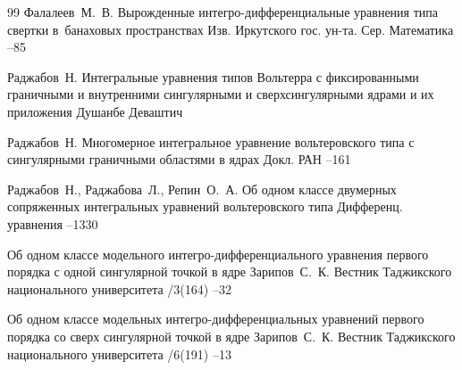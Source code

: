 {\begin{thebibliography}{99}
\by Фалалеев~М.~В.
\paper Вырожденные интегро-дифференциальные уравнения типа свертки в~банаховых пространствах
\jour Изв. Иркутского гос. ун-та. Сер. Математика
--85

\by Раджабов~Н.
\book Интегральные уравнения типов Вольтерра с фиксированными граничными и внутренними сингулярными и сверхсингулярными ядрами и их приложения
\publaddr Душанбе
\publ Деваштич

\by Раджабов~Н.
\paper Многомерное интегральное уравнение вольтеровского типа с сингулярными граничными областями в ядрах
\jour Докл. РАН
--161

\by Раджабов~Н., Раджабова~Л., Репин~О.~А.
\paper Об одном классе двумерных сопряженных интегральных уравнений вольтеровского типа
\jour Дифференц. уравнения
--1330

\paper Об одном классе модельного интегро-дифференциального уравнения первого порядка с одной сингулярной точкой в ядре
\by Зарипов~С.~К.
\jour Вестник Таджикского национального университета
/3(164)
--32

\paper Об одном классе модельных интегро-дифференциальных уравнений первого порядка со сверх сингулярной точкой в ядре
\by Зарипов~С.~К.
\jour Вестник Таджикского национального университета
/6(191)
--13




\end{thebibliography}


\newpage

\makeentitle


}
